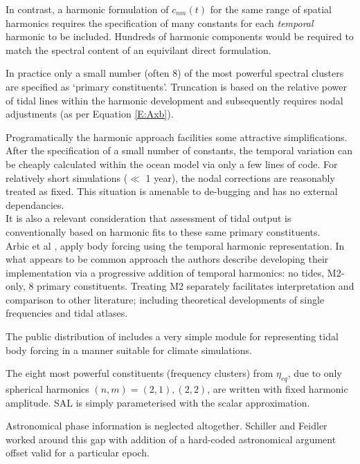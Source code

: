 In contrast, a harmonic formulation of $c_{nm}(t)$ for the same range of spatial harmonics requires the specification of many constants for each \emph{temporal} harmonic to be included.  
Hundreds of harmonic components \citep[pp3]{Desai:2006wo} would be required to match the spectral content of an equivilant direct formulation.

In practice only a small number (often 8) of the most powerful spectral clusters are specified as `primary constituents'.  
Truncation is based on the relative power of tidal lines within the harmonic development and subsequently requires nodal adjustments (as per Equation \ref{E:Axb}).

Programatically the harmonic approach facilities some attractive simplifications.  
After the specification of a small number of constants, the temporal variation can be cheaply calculated within the ocean model via only a few lines of code.   
For relatively short simulations ($\ll$ 1 year), the nodal corrections are reasonably treated as fixed.   This situation is amenable to de-bugging and has no external dependancies.\\
It is also a relevant consideration that assessment of tidal output is conventionally based on harmonic fits to these same primary constituents.\\

Arbic et al \citep{Arbic:2010us}, apply body forcing using the temporal harmonic representation.  In what appears to be common approach the authors describe developing their implementation via a progressive addition of temporal harmonics: no tides, M2-only, 8 primary constituents.  Treating M2 separately facilitates interpretation and comparison to other literature; including theoretical developments of single frequencies and tidal atlases.



The public distribution of \MOM{} includes a very simple module for representing tidal body forcing in a manner suitable for climate simulations\cite[pp263] {Griffies:2008vh}.


The eight most powerful constituents (frequency clusters) from $\eta_{eq}$, due to only spherical harmonics $(n,m) = (2,1) , (2,2)$, are written with fixed harmonic amplitude.  SAL is simply parameterised with the scalar approximation. 


Astronomical phase information is neglected altogether.
Schiller and Feidler \citep{Schiller:2007gk} worked around this gap with addition of a hard-coded astronomical argument offset valid for a particular epoch.

